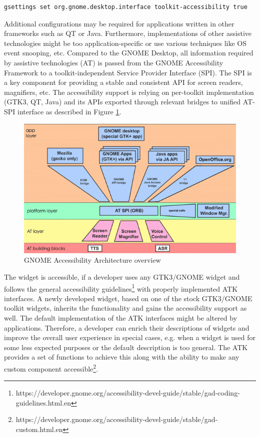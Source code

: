 \begin{lstlisting}[numbers=none,caption={Enabling accessibility via gsettings command},label={gsettings}]
gsettings set org.gnome.desktop.interface toolkit-accessibility true
\end{lstlisting}

Additional configurations may be required for applications written in other frameworks such as QT or Java. Furthermore, implementations of other assistive technologies might be too application-specific or use various techniques like OS event snooping, etc. Compared to the GNOME Desktop, all information required by assistive technologies (AT) is passed from the GNOME Accessibility Framework to a toolkit-independent Service Provider Interface (SPI). The SPI is a key component for providing a stable and consistent API for screen readers, magnifiers, etc. The accessibility support is relying on per-toolkit implementation (GTK3, QT, Java) and its APIs exported through relevant bridges to unified AT-SPI interface as described in Figure \ref{ATSPI_architecture}.

\begin{figure}[hbt]
	\centering
	\includegraphics[width=1\textwidth]{obrazky-figures/GNOME_desktop_Accessibility.png}
	\caption{GNOME Accessibility Architecture overview\cite{gnomeADG}}
	\label{ATSPI_architecture}
\end{figure}

The widget is accessible, if a developer uses any GTK3/GNOME widget and follows the general accessibility guidelines\footnote{https://developer.gnome.org/accessibility-devel-guide/stable/gad-coding-guidelines.html.en} with properly implemented ATK interfaces. A newly developed widget, based on one of the stock GTK3/GNOME toolkit widgets, inherits the functionality and gains the accessibility support as well. The default implementation of the ATK interfaces might be altered by applications. Therefore, a developer can enrich their descriptions of widgets and improve the overall user experience in special cases, e.g. when a widget is used for some less expected purposes or the default description is too general. The ATK provides a set of functions to achieve this along with the ability to make any custom component accessible\footnote{https://developer.gnome.org/accessibility-devel-guide/stable/gad-custom.html.en}.\cite{accessibleWidgets}

